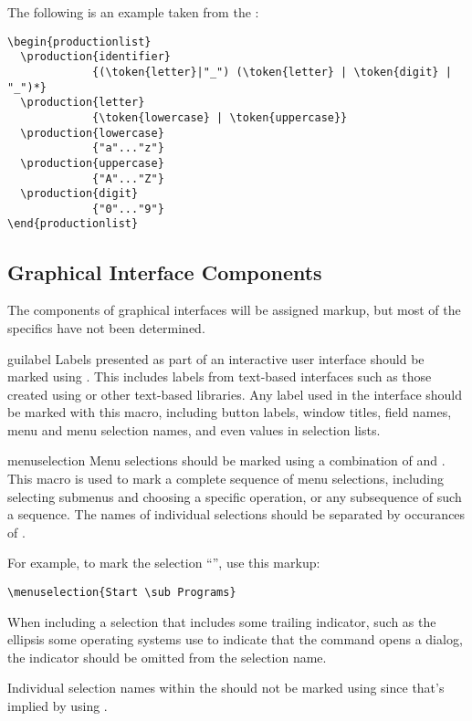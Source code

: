 \documentclass{howto}
\begin{document}
    The following is an example taken from the
    :

\begin{verbatim}
\begin{productionlist}
  \production{identifier}
             {(\token{letter}|"_") (\token{letter} | \token{digit} | "_")*}
  \production{letter}
             {\token{lowercase} | \token{uppercase}}
  \production{lowercase}
             {"a"..."z"}
  \production{uppercase}
             {"A"..."Z"}
  \production{digit}
             {"0"..."9"}
\end{productionlist}
\end{verbatim}


\subsection{Graphical Interface Components \label{gui-markup}}

  The components of graphical interfaces will be assigned markup, but
  most of the specifics have not been determined.

  \begin{macrodesc}{guilabel}{}
    Labels presented as part of an interactive user interface should
    be marked using .  This includes labels from
    text-based interfaces such as those created using  or
    other text-based libraries.  Any label used in the interface
    should be marked with this macro, including button labels, window
    titles, field names, menu and menu selection names, and even
    values in selection lists.
  \end{macrodesc}

  \begin{macrodesc}{menuselection}{}
    Menu selections should be marked using a combination of
     and .  This macro is used to mark
    a complete sequence of menu selections, including selecting
    submenus and choosing a specific operation, or any subsequence of
    such a sequence.  The names of individual selections should be
    separated by occurances of .

    For example, to mark the selection ``'', use this markup:

\begin{verbatim}
\menuselection{Start \sub Programs}
\end{verbatim}

    When including a selection that includes some trailing indicator,
    such as the ellipsis some operating systems use to indicate that
    the command opens a dialog, the indicator should be omitted from
    the selection name.

    Individual selection names within the  should
    not be marked using  since that's implied by using
    .
  \end{macrodesc}
\end{document}
